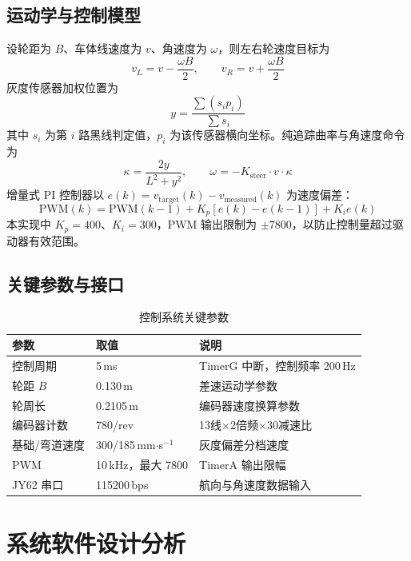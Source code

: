 \documentclass[12pt,a4paper,fontset=fandol]{ctexart}
\begin{document}
\subsection{运动学与控制模型}
设轮距为 $B$、车体线速度为 $v$、角速度为 $\omega$，则左右轮速度目标为
\begin{equation}
v_L=v-\frac{\omega B}{2},\qquad v_R=v+\frac{\omega B}{2}
\end{equation}
灰度传感器加权位置为
\begin{equation}
y=\frac{\sum(s_i p_i)}{\sum s_i}
\end{equation}
其中 $s_i$ 为第 $i$ 路黑线判定值，$p_i$ 为该传感器横向坐标。纯追踪曲率与角速度命令为
\begin{equation}
\kappa=\frac{2y}{L^2+y^2},\qquad \omega=-K_{\mathrm{steer}}\cdot v\cdot\kappa
\end{equation}
增量式 PI 控制器以 $e(k)=v_{\mathrm{target}}(k)-v_{\mathrm{measured}}(k)$ 为速度偏差：
\begin{equation}
\mathrm{PWM}(k)=\mathrm{PWM}(k-1)+K_p[e(k)-e(k-1)]+K_i e(k)
\end{equation}
本实现中 $K_p=400$、$K_i=300$，PWM 输出限制为 $\pm7800$，以防止控制量超过驱动器有效范围。

\subsection{关键参数与接口}
\begin{table}[H]
\centering
\caption{控制系统关键参数}
\begin{tabularx}{\textwidth}{p{3.2cm}p{3.6cm}Y}
\toprule
参数 & 取值 & 说明\\
\midrule
控制周期 & 5\,ms & TimerG 中断，控制频率 200\,Hz\\
轮距 $B$ & 0.130\,m & 差速运动学参数\\
轮周长 & 0.2105\,m & 编码器速度换算参数\\
编码器计数 & 780/rev & 13线×2倍频×30减速比\\
基础/弯道速度 & 300/185\,mm$\cdot$s$^{-1}$ & 灰度偏差分档速度\\
PWM & 10\,kHz，最大 7800 & TimerA 输出限幅\\
JY62 串口 & 115200\,bps & 航向与角速度数据输入\\
\bottomrule
\end{tabularx}
\end{table}

\section{系统软件设计分析}
\end{document}
